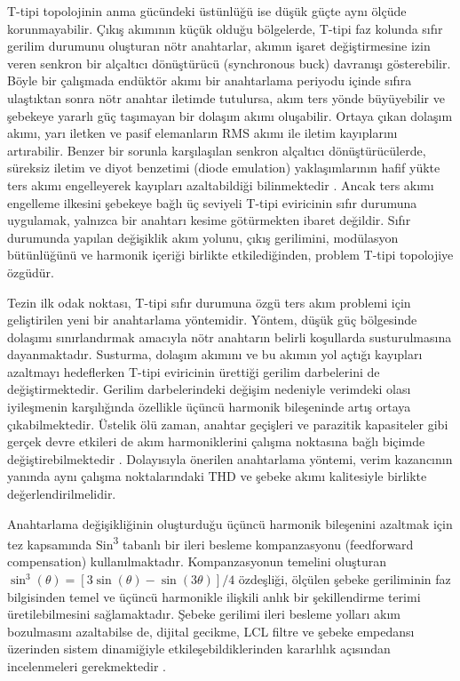 T-tipi topolojinin anma gücündeki üstünlüğü ise düşük güçte aynı ölçüde korunmayabilir. Çıkış akımının küçük olduğu bölgelerde, T-tipi faz kolunda sıfır gerilim durumunu oluşturan nötr anahtarlar, akımın işaret değiştirmesine izin veren senkron bir alçaltıcı dönüştürücü (synchronous buck) davranışı gösterebilir. Böyle bir çalışmada endüktör akımı bir anahtarlama periyodu içinde sıfıra ulaştıktan sonra nötr anahtar iletimde tutulursa, akım ters yönde büyüyebilir ve şebekeye yararlı güç taşımayan bir dolaşım akımı oluşabilir. Ortaya çıkan dolaşım akımı, yarı iletken ve pasif elemanların RMS akımı ile iletim kayıplarını artırabilir. Benzer bir sorunla karşılaşılan senkron alçaltıcı dönüştürücülerde, süreksiz iletim ve diyot benzetimi (diode emulation) yaklaşımlarının hafif yükte ters akımı engelleyerek kayıpları azaltabildiği bilinmektedir \citep{Erickson2001,Mohan2003,Chen2010}. Ancak ters akımı engelleme ilkesini şebekeye bağlı üç seviyeli T-tipi eviricinin sıfır durumuna uygulamak, yalnızca bir anahtarı kesime götürmekten ibaret değildir. Sıfır durumunda yapılan değişiklik akım yolunu, çıkış gerilimini, modülasyon bütünlüğünü ve harmonik içeriği birlikte etkilediğinden, problem T-tipi topolojiye özgüdür.

Tezin ilk odak noktası, T-tipi sıfır durumuna özgü ters akım problemi için geliştirilen yeni bir anahtarlama yöntemidir. Yöntem, düşük güç bölgesinde dolaşımı sınırlandırmak amacıyla nötr anahtarın belirli koşullarda susturulmasına dayanmaktadır. Susturma, dolaşım akımını ve bu akımın yol açtığı kayıpları azaltmayı hedeflerken T-tipi eviricinin ürettiği gerilim darbelerini de değiştirmektedir. Gerilim darbelerindeki değişim nedeniyle verimdeki olası iyileşmenin karşılığında özellikle üçüncü harmonik bileşeninde artış ortaya çıkabilmektedir. Üstelik ölü zaman, anahtar geçişleri ve parazitik kapasiteler gibi gerçek devre etkileri de akım harmoniklerini çalışma noktasına bağlı biçimde değiştirebilmektedir \citep{Zhang2014Deadtime}. Dolayısıyla önerilen anahtarlama yöntemi, verim kazancının yanında aynı çalışma noktalarındaki THD ve şebeke akımı kalitesiyle birlikte değerlendirilmelidir.

Anahtarlama değişikliğinin oluşturduğu üçüncü harmonik bileşenini azaltmak için tez kapsamında Sin\textsuperscript{3} tabanlı bir ileri besleme kompanzasyonu (feedforward compensation) kullanılmaktadır. Kompanzasyonun temelini oluşturan $\sin^3(\theta)=[3\sin(\theta)-\sin(3\theta)]/4$ özdeşliği, ölçülen şebeke geriliminin faz bilgisinden temel ve üçüncü harmonikle ilişkili anlık bir şekillendirme terimi üretilebilmesini sağlamaktadır. Şebeke gerilimi ileri besleme yolları akım bozulmasını azaltabilse de, dijital gecikme, LCL filtre ve şebeke empedansı üzerinden sistem dinamiğiyle etkileşebildiklerinden kararlılık açısından incelenmeleri gerekmektedir \citep{Lu2016,Wang2024}.


